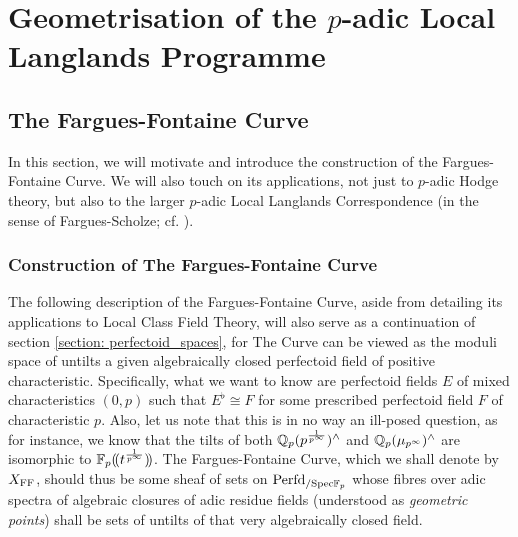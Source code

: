 \chapter{Geometrisation of the \texorpdfstring{$p$}{}-adic Local Langlands Programme}
    \begin{abstract}
        
    \end{abstract}
    
    \minitoc
    
    \section{The Fargues-Fontaine Curve} \label{section: the_fargues_fontaine_curve}
        In this section, we will motivate and introduce the construction of the Fargues-Fontaine Curve. We will also touch on its applications, not just to $p$-adic Hodge theory, but also to the larger $p$-adic Local Langlands Correspondence (in the sense of Fargues-Scholze; cf. \cite{fargues_scholze_geometrization_of_local_langlands}).
    
        \subsection{Construction of The Fargues-Fontaine Curve}
            The following description of the Fargues-Fontaine Curve, aside from detailing its applications to Local Class Field Theory, will also serve as a continuation of section \ref{section: perfectoid_spaces}, for The Curve can be viewed as the moduli space of untilts a given algebraically closed perfectoid field of positive characteristic. Specifically, what we want to know are perfectoid fields $E$ of mixed characteristics $(0, p)$ such that $E^{\flat} \cong F$ for some prescribed perfectoid field $F$ of characteristic $p$. Also, let us note that this is in no way an ill-posed question, as for instance, we know that the tilts of both $\mathbb{Q}_p(p^{\frac{1}{p^{\infty}}})^{\wedge}$ and $\mathbb{Q}_p(\mu_{p^{\infty}})^{\wedge}$ are isomorphic to $\mathbb{F}_p(\!(t^{\frac{1}{p^{\infty}}})\!)$. The Fargues-Fontaine Curve, which we shall denote by $X_{\mathrm{FF}}$, should thus be some sheaf of sets on $\mathrm{Perfd}_{/\mathrm{Spec} \mathbb{F}_p}$ whose fibres over adic spectra of algebraic closures of adic residue fields (understood as \textit{geometric points}) shall be sets of untilts of that very algebraically closed field.
            
